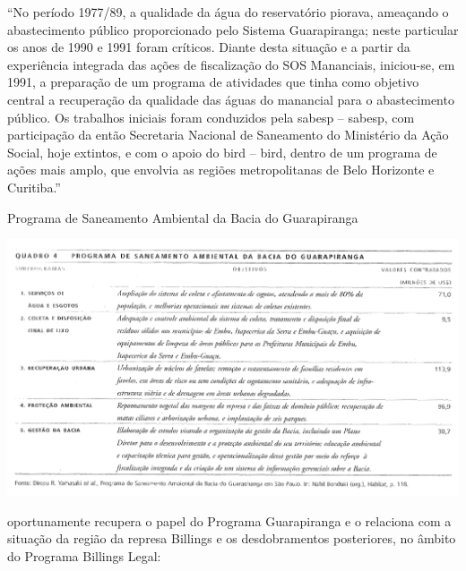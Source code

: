 	\begin{citacao}
		``No período 1977/89, a qualidade da água do reservatório piorava, ameaçando o abastecimento público proporcionado pelo Sistema Guarapiranga; neste particular os anos de 1990 e 1991 foram críticos. Diante desta situação e a partir da experiência integrada das ações de fiscalização do SOS Mananciais, iniciou-se, em 1991, a preparação de um programa de atividades que tinha como objetivo central a recuperação da qualidade das águas do manancial para o abastecimento público. Os trabalhos iniciais foram conduzidos pela \gls{sabesp} -- \glsdesc{sabesp}, com participação da então Secretaria Nacional de Saneamento do Ministério da Ação Social, hoje extintos, e com o apoio do \glsdesc{bird} -- \gls{bird}, dentro de um programa de ações mais amplo, que envolvia as regiões metropolitanas de Belo Horizonte e Curitiba.''
	\end{citacao}
	
	\begin{table}[htb]
		\centering
		\caption{Programa de Saneamento Ambiental da Bacia do Guarapiranga}
		\includegraphics[width=\linewidth]{img/francca_p029_tabela_programa}
		\label{tab:francca_programa}
	\end{table}
	
	 oportunamente recupera o papel do Programa Guarapiranga e o relaciona com a situação da região da represa Billings e os desdobramentos posteriores, no âmbito do Programa Billings Legal:
	
